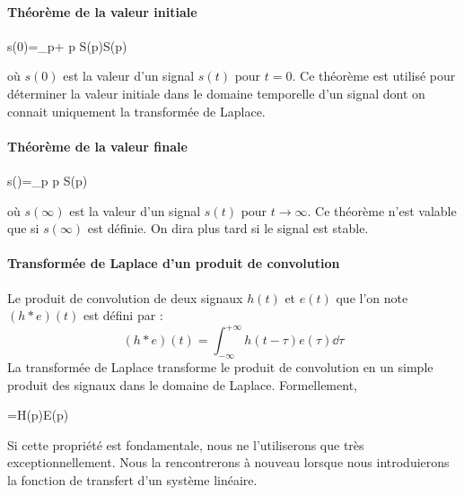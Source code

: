 \paragraph{Théorème de la valeur initiale}
\begin{bequation}
    s(0)=\lim\limits_{p\rightarrow+\infty} p S(p)\qquad \forall S(p)
\end{bequation}
où $s(0)$ est la valeur d'un signal $s(t)$ pour $t=0$.
Ce théorème est utilisé pour déterminer la valeur initiale
dans le domaine temporelle d'un signal dont on connait 
uniquement la transformée de Laplace.

\paragraph{Théorème de la valeur finale}
\begin{bequation}
    s(\infty)=\lim\limits_{p} p S(p)
\end{bequation}
où $s(\infty)$ est la valeur d'un signal $s(t)$ pour $t\to\infty$.
Ce théorème n'est valable que si $s(\infty)$ est définie. On dira plus tard
si le signal est stable.


\paragraph{Transformée de Laplace d'un produit de convolution}
Le produit de convolution de deux signaux $h(t)$ et $e(t)$ que l'on note $(h*e)(t)$
est défini par :
$$
(h*e)(t)=\int_{-\infty}^{+\infty}h(t-\tau)e(\tau)\dd{\tau}
$$
La transformée de Laplace transforme le produit de convolution en un simple
produit des signaux dans le domaine de Laplace. Formellement,
\begin{bequation}
    =H(p)E(p)
\end{bequation}
Si cette propriété est fondamentale, nous ne l'utiliserons 
que très exceptionnellement. Nous la rencontrerons à nouveau 
lorsque nous introduierons la fonction de transfert d'un système linéaire.

